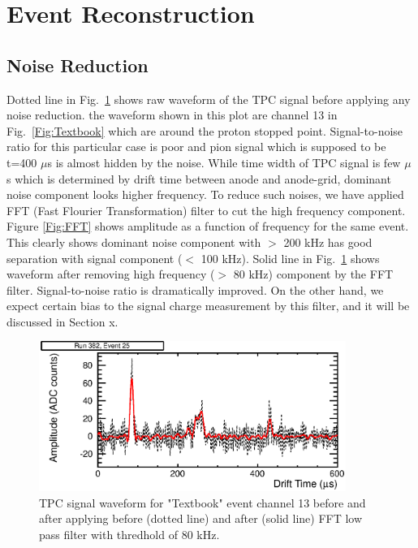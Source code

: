 \section{Event Reconstruction}
\subsection{Noise Reduction}

Dotted line in Fig.~\ref{Fig:beforeafterFFT} shows raw waveform of the TPC signal
before applying any noise reduction. the waveform shown in this plot
are channel 13 in Fig.~\ref{Fig:Textbook} which are around the proton stopped point.
Signal-to-noise ratio for this particular case is poor and pion signal 
which is supposed to be t=400 $\mu$s is almost hidden by the noise. 
While time width of TPC signal is few $\mu$s which is determined by
drift time between anode and anode-grid, dominant noise component looks
higher frequency. To reduce such noises, we have applied FFT 
(Fast Flourier Transformation) filter to cut the high frequency component.
Figure \ref{Fig:FFT} shows amplitude as a function of frequency
for the same event. This clearly shows dominant noise component with
$>$ 200 kHz has good separation with signal component ($<$ 100 kHz).
Solid line in Fig.~\ref{Fig:beforeafterFFT} shows waveform after removing high frequency
($>$ 80 kHz) component by the FFT filter. Signal-to-noise ratio is dramatically
improved. On the other hand, we expect certain bias to the signal charge
measurement by this filter, and it will be discussed in Section x.

\begin{figure}[htbp]
 \begin{center}
  \includegraphics[width=100mm]{fig/beforeafterFFT.eps}
 \end{center}
 \caption{TPC signal waveform for "Textbook" event channel 13 before and after applying before (dotted line) and after (solid line) FFT low pass filter with thredhold of 80 kHz.}
 \label{Fig:beforeafterFFT}
\end{figure}

